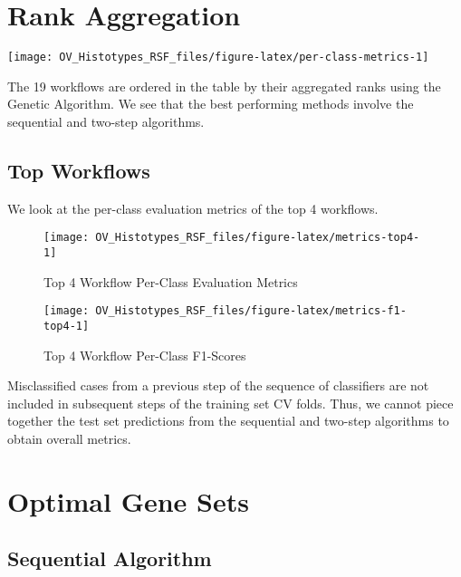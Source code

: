 \documentclass[
]{report}
\begin{document}
\section{Rank Aggregation}\label{rank-aggregation}

\begin{center}\texttt{[image: OV\_Histotypes\_RSF\_files/figure-latex/per-class-metrics-1]} \end{center}

The 19 workflows are ordered in the table by their aggregated ranks using the Genetic Algorithm. We see that the best performing methods involve the sequential and two-step algorithms.

\subsection{Top Workflows}\label{top-workflows}

We look at the per-class evaluation metrics of the top 4 workflows.

\begin{figure}[H]

{\centering \texttt{[image: OV\_Histotypes\_RSF\_files/figure-latex/metrics-top4-1]} 

}

\caption{Top 4 Workflow Per-Class Evaluation Metrics}\label{fig:metrics-top4}
\end{figure}

\begin{figure}[H]

{\centering \texttt{[image: OV\_Histotypes\_RSF\_files/figure-latex/metrics-f1-top4-1]} 

}

\caption{Top 4 Workflow Per-Class F1-Scores}\label{fig:metrics-f1-top4}
\end{figure}

Misclassified cases from a previous step of the sequence of classifiers are not included in subsequent steps of the training set CV folds. Thus, we cannot piece together the test set predictions from the sequential and two-step algorithms to obtain overall metrics.

\section{Optimal Gene Sets}\label{optimal-gene-sets}

\subsection{Sequential Algorithm}\label{sequential-algorithm-1}
\end{document}
